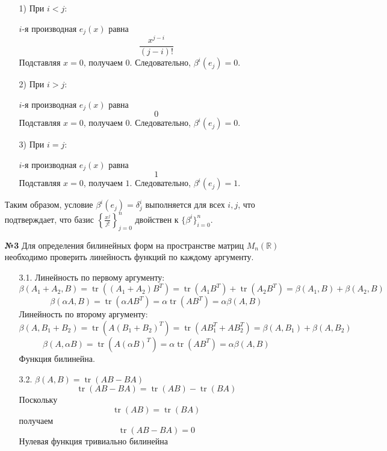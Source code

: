 \documentclass[a4paper]{article}
\begin{document}
\begin{enumerate}
    \begin{enumerate}
        \item[1)]
        При \( i < j \):  
         
        \( i \)-я производная \( e_j(x) \) равна 
        \[ \frac{x^{j-i}}{(j-i)!} \]
        Подставляя \( x = 0 \), получаем \( 0 \).  
        Следовательно, \( \beta^i(e_j) = 0 \). 
        \item[2)] При \( i > j \):  
         
        \( i \)-я производная \( e_j(x) \) равна 
        \[ 0 \]
        Подставляя \( x = 0 \), получаем \( 0 \).  
        Следовательно, \( \beta^i(e_j) = 0 \). 
        
        \item[3)]При \( i = j \):  
         
        \( i \)-я производная \( e_j(x) \) равна 
        \[ 1 \]
        Подставляя \( x = 0 \), получаем \( 1 \).  
        Следовательно, \( \beta^i(e_j) = 1 \). 

    \end{enumerate}
    Таким образом, условие \( \beta^i(e_j) = \delta^i_j \)
     выполняется для всех \( i, j \), что подтверждает, что базис
      \( \left\{\frac{x^j}{j!}\right\}_{j=0}^n \) двойствен к \( \{\beta^i\}_{i=0}^n \).\\


    \item[\textbf{№3}]Для определения билинейных форм на пространстве матриц 
    \( M_n(\mathbb{R}) \) необходимо проверить линейность функций по каждому аргументу.
    \begin{enumerate}
        \item[3.1.] Линейность по первому аргументу:  
        \[\beta(A_1 + A_2, B) = \operatorname{tr}((A_1 + A_2) B^T) = 
        \operatorname{tr}(A_1 B^T) + \operatorname{tr}(A_2 B^T) =
         \beta(A_1, B) + \beta(A_2, B)\]  
        \[\beta(\alpha A, B) = \operatorname{tr}(\alpha A B^T) =
         \alpha \operatorname{tr}(A B^T) = \alpha \beta(A, B)\]  
      Линейность по второму аргументу:  
        \[\beta(A, B_1 + B_2) = \operatorname{tr}(A (B_1 + B_2)^T) 
        = \operatorname{tr}(A B_1^T + A B_2^T) = \beta(A, B_1) + \beta(A, B_2)\]
        \[\beta(A, \alpha B) = \operatorname{tr}(A (\alpha B)^T) = 
        \alpha \operatorname{tr}(A B^T) = \alpha \beta(A, B)\]
        Функция билинейна.  

        \item[3.2.]\( \beta(A, B) = \operatorname{tr}(AB - BA) \) 
        \[\operatorname{tr}(AB - BA) = \operatorname{tr}(AB) - \operatorname{tr}(BA)\]
        Поскольку \[\operatorname{tr}(AB) = \operatorname{tr}(BA)\]
        получаем \[\operatorname{tr}(AB - BA) = 0\]
        Нулевая функция тривиально билинейна


\end{enumerate}
\end{enumerate}
\end{document}

